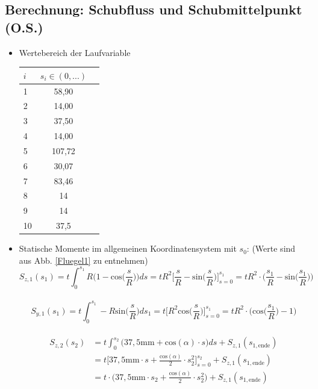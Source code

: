 \subsection{Berechnung: Schubfluss und Schubmittelpunkt (O.S.)}\label{SchubRechnung}
\begin{itemize}
	\item Wertebereich der Laufvariable
	\begin{center}
		\begin{tabular}[h]{l|c|c}
			$i$&$s_i\in(0,...)$\\
			\hline
			1&58,90\\
			2&14,00\\
			3&37,50\\
			4&14,00\\
			5&107,72\\
			6&30,07\\
			7&83,46\\
			8&14\\
			9&14\\
			10&37,5\\
		\end{tabular}
	\end{center}
	\item Statische Momente im allgemeinen Koordinatensystem mit $s_0$: (Werte sind aus Abb. \ref{Fluegel1} zu entnehmen)
	\begin{equation}
		S_{z,1}(s_1) = t\int_{0}^{s_1} R\bigg(1-\mathrm{cos}\bigg(\frac{s}{R}\bigg)\bigg)ds = tR^2\bigg[\frac{s}{R} - \mathrm{sin}\bigg(\frac{s}{R}\bigg)\bigg]_{s=0}^{s_1} = tR^2\cdot\bigg(\frac{s_1}{R}-\mathrm{sin}\bigg(\frac{s_1}{R}\bigg)\bigg)
	\end{equation}\\
	\begin{equation}
		S_{y,1}(s_1) = t\int_{0}^{s_1} -R\mathrm{sin}\bigg(\frac{s}{R}\bigg)ds_1 = t\biggl[ R^2 \mathrm{cos}\bigg(\frac{s}{R}\bigg)\biggr]^{s_1}_{s=0} = tR^2 \cdot\bigg(\mathrm{cos}\bigg(\frac{s_1}{R}\bigg)-1\bigg)
	\end{equation}\\
\begin{equation}
	\begin{split}
		S_{z,2}(s_2) &= t\int_{0}^{s_2}\bigg(37,5\mathrm{mm}+\mathrm{cos}(\alpha)\cdot s\bigg)ds + S_{z,1}(s_{1,\mathrm{ende}}) \\\
		&= t\bigg[37,5\mathrm{mm}\cdot s +\frac{\mathrm{cos}(\alpha)}{2}\cdot s^2_2\bigg]_{s=0}^{s_2} + S_{z,1}(s_{1,\mathrm{ende}}) \\\ 
		&= t\cdot\bigg(37,5\mathrm{mm}\cdot s_2 +\frac{\mathrm{cos}(\alpha)}{2}\cdot s^2_2\bigg) + S_{z,1}(s_{1,\mathrm{ende}})

\end{split}
\end{equation}
\end{itemize}
